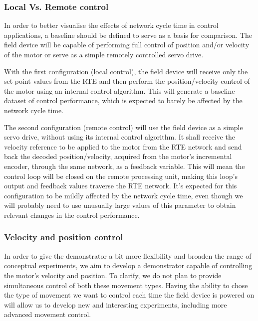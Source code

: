 \subsubsection{Local Vs. Remote control} \label{subsec:local_remote}

In order to better visualise the effects of network cycle time in control applications, a baseline should be defined to serve as a basis for comparison.
The field device will be capable of performing full control of position and/or velocity of the motor or serve as a simple remotely controlled servo drive.

With the first configuration (local control), the field device will receive only the set-point values from the RTE and then perform the position/velocity control of the motor using an internal control algorithm.
This will generate a baseline dataset of control performance, which is expected to barely be affected by the network cycle time.

The second configuration (remote control) will use the field device as a simple servo drive, without using its internal control algorithm.
It shall receive the velocity reference to be applied to the motor from the RTE network and send back the decoded position/velocity, acquired from the motor's incremental encoder, through the same network, as a feedback variable.
This will mean the control loop will be closed on the remote processing unit, making this loop's output and feedback values traverse the RTE network.
It's expected for this configuration to be mildly affected by the network cycle time, even though we will probably need to use unusually large values of this parameter to obtain relevant changes in the control performance.

\subsubsection{Velocity and position control}

In order to give the demonstrator a bit more flexibility and broaden the range of conceptual experiments, we aim to develop a demonstrator capable of controlling the motor's velocity and position.
To clarify, we do not plan to provide simultaneous control of both these movement types.
Having the ability to chose the type of movement we want to control each time the field device is powered on will allow us to develop new and interesting experiments, including more advanced movement control.
